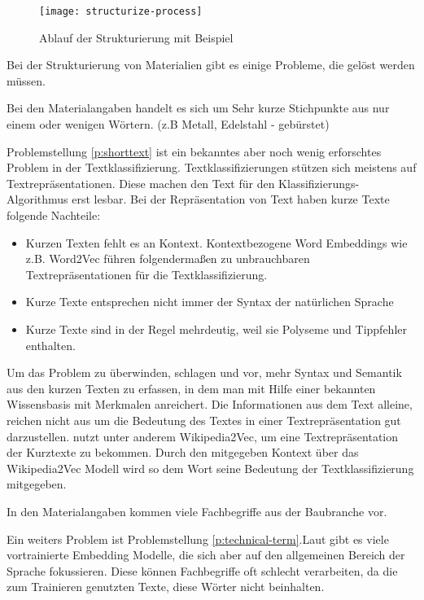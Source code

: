 \begin{figure}[h]
	\centering
	\texttt{[image: structurize-process]}
	\caption[Ablauf]{Ablauf der Strukturierung mit Beispiel }
	\label{fig:structurize-process}
\end{figure}

Bei der Strukturierung von Materialien gibt es einige Probleme, die gelöst werden müssen. 
\begin{problem}
	\label{p:shorttext}
	Bei den Materialangaben handelt es sich um Sehr kurze Stichpunkte aus nur einem oder wenigen Wörtern. (z.B Metall, Edelstahl - gebürstet)
\end{problem}

Problemstellung \ref{p:shorttext} ist ein bekanntes aber noch wenig erforschtes Problem in der Textklassifizierung. Textklassifizierungen stützen sich meistens auf Textrepräsentationen. Diese machen den Text für den Klassifizierungs-Algorithmus erst lesbar. Bei der Repräsentation von Text haben kurze Texte folgende Nachteile:

\begin{itemize}
	\setlength\itemsep{0.1em}
	\item Kurzen Texten fehlt es an Kontext. Kontextbezogene Word Embeddings wie z.B. Word2Vec führen folgendermaßen zu unbrauchbaren Textrepräsentationen für die Textklassifizierung.
	\item Kurze Texte entsprechen nicht immer der Syntax der natürlichen Sprache
	\item Kurze Texte sind in der Regel mehrdeutig, weil sie
	Polyseme und Tippfehler enthalten. \citep{ijcai2017p406}
\end{itemize}

Um das Problem zu überwinden, schlagen \cite{ijcai2017p406} und \cite{chen2019deep} vor, mehr Syntax und Semantik aus den kurzen Texten zu erfassen, in dem man mit Hilfe einer bekannten Wissensbasis mit Merkmalen anreichert. Die Informationen aus dem Text alleine, reichen nicht aus um die Bedeutung des Textes in einer Textrepräsentation gut darzustellen.
\cite{Qingyuan2019} nutzt unter anderem Wikipedia2Vec, um eine Textrepräsentation der Kurztexte zu bekommen. Durch den mitgegeben Kontext über das Wikipedia2Vec Modell wird so dem Wort seine Bedeutung der Textklassifizierung mitgegeben.

\begin{problem}
	\label{p:technical-term}
	In den Materialangaben kommen viele Fachbegriffe aus der Baubranche vor.
\end{problem}
Ein weiters Problem ist Problemstellung \ref{p:technical-term}.Laut \cite{nooralahzadeh2018evaluation} gibt es viele vortrainierte Embedding Modelle, die sich aber auf den allgemeinen Bereich der Sprache fokussieren. Diese können Fachbegriffe oft schlecht verarbeiten, da die zum Trainieren genutzten Texte, diese Wörter nicht beinhalten.


